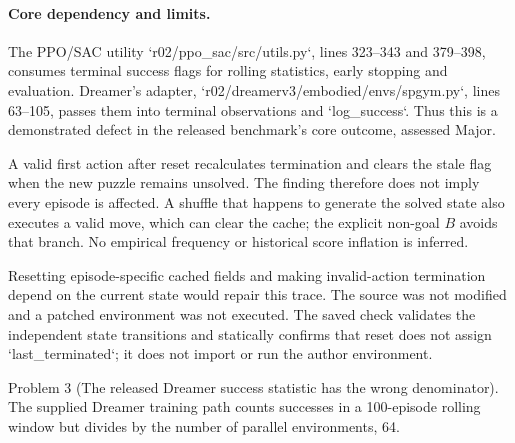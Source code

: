 \documentclass[10pt]{article}
\begin{document}
\paragraph*{Core dependency and limits.}\mbox{}\par
The PPO/SAC utility `r02/ppo\_sac/src/utils.py`, lines 323–343 and 379–398, consumes terminal success flags for rolling statistics, early stopping and evaluation. Dreamer’s adapter, `r02/dreamerv3/embodied/envs/spgym.py`, lines 63–105, passes them into terminal observations and `log\_success`. Thus this is a demonstrated defect in the released benchmark’s core outcome, assessed Major.\par
A valid first action after reset recalculates termination and clears the stale flag when the new puzzle remains unsolved. The finding therefore does not imply every episode is affected. A shuffle that happens to generate the solved state also executes a valid move, which can clear the cache; the explicit non-goal \(B\) avoids that branch. No empirical frequency or historical score inflation is inferred.\par
Resetting episode-specific cached fields and making invalid-action termination depend on the current state would repair this trace. The source was not modified and a patched environment was not executed. The saved check validates the independent state transitions and statically confirms that reset does not assign `last\_terminated`; it does not import or run the author environment.\par
Problem 3 (The released Dreamer success statistic has the wrong denominator).  The supplied Dreamer training path counts successes in a 100-episode rolling window but divides by the number of parallel environments, 64.\par
\end{document}

